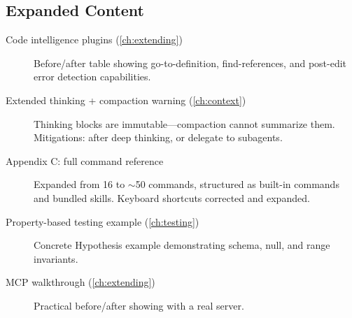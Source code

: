 \subsection*{Expanded Content}

\begin{description}
  \item[Code intelligence plugins (\cref{ch:extending})]
    Before/after table showing go-to-definition, find-references, and
    post-edit error detection capabilities.

  \item[Extended thinking + compaction warning (\cref{ch:context})]
    Thinking blocks are immutable---compaction cannot summarize them.
    Mitigations:  after deep thinking, or delegate to subagents.

  \item[Appendix C: full command reference]
    Expanded from 16 to $\sim$50 commands, structured as built-in commands
    and bundled skills. Keyboard shortcuts corrected and expanded.

  \item[Property-based testing example (\cref{ch:testing})]
    Concrete Hypothesis example demonstrating schema, null, and range invariants.

  \item[MCP walkthrough (\cref{ch:extending})]
    Practical before/after showing  with a real server.
\end{description}
